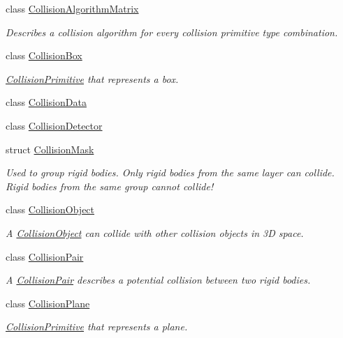 \begin{DoxyCompactItemize}
\item 
class \mbox{\hyperlink{classr3_1_1_collision_algorithm_matrix}{Collision\+Algorithm\+Matrix}}
\begin{DoxyCompactList}\small\item\em Describes a collision algorithm for every collision primitive type combination. \end{DoxyCompactList}\item 
class \mbox{\hyperlink{classr3_1_1_collision_box}{Collision\+Box}}
\begin{DoxyCompactList}\small\item\em \mbox{\hyperlink{classr3_1_1_collision_primitive}{Collision\+Primitive}} that represents a box. \end{DoxyCompactList}\item 
class \mbox{\hyperlink{classr3_1_1_collision_data}{Collision\+Data}}
\item 
class \mbox{\hyperlink{classr3_1_1_collision_detector}{Collision\+Detector}}
\item 
struct \mbox{\hyperlink{structr3_1_1_collision_mask}{Collision\+Mask}}
\begin{DoxyCompactList}\small\item\em Used to group rigid bodies. Only rigid bodies from the same layer can collide. Rigid bodies from the same group cannot collide! \end{DoxyCompactList}\item 
class \mbox{\hyperlink{classr3_1_1_collision_object}{Collision\+Object}}
\begin{DoxyCompactList}\small\item\em A \mbox{\hyperlink{classr3_1_1_collision_object}{Collision\+Object}} can collide with other collision objects in 3D space. \end{DoxyCompactList}\item 
class \mbox{\hyperlink{classr3_1_1_collision_pair}{Collision\+Pair}}
\begin{DoxyCompactList}\small\item\em A \mbox{\hyperlink{classr3_1_1_collision_pair}{Collision\+Pair}} describes a potential collision between two rigid bodies. \end{DoxyCompactList}\item 
class \mbox{\hyperlink{classr3_1_1_collision_plane}{Collision\+Plane}}
\begin{DoxyCompactList}\small\item\em \mbox{\hyperlink{classr3_1_1_collision_primitive}{Collision\+Primitive}} that represents a plane. \end{DoxyCompactList}\item 

\end{DoxyCompactItemize}

